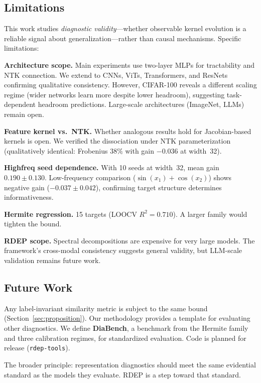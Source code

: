 \documentclass[twoside,11pt]{article}
\begin{document}
\subsection{Limitations}

This work studies \emph{diagnostic validity}---whether observable kernel evolution is a reliable signal about generalization---rather than causal mechanisms. Specific limitations:

\textbf{Architecture scope.} Main experiments use two-layer MLPs for tractability and NTK connection. We extend to CNNs, ViTs, Transformers, and ResNets confirming qualitative consistency. However, CIFAR-100 reveals a different scaling regime (wider networks learn more despite lower headroom), suggesting task-dependent headroom predictions. Large-scale architectures (ImageNet, LLMs) remain open.

\textbf{Feature kernel vs.\ NTK.} Whether analogous results hold for Jacobian-based kernels is open. We verified the dissociation under NTK parameterization (qualitatively identical: Frobenius $38\%$ with gain $-0.036$ at width~32).

\textbf{Highfreq seed dependence.} With 10 seeds at width~32, mean gain $0.190\pm0.130$. Low-frequency comparison ($\sin(x_1)+\cos(x_2)$) shows negative gain ($-0.037\pm0.042$), confirming target structure determines informativeness.

\textbf{Hermite regression.} 15 targets (LOOCV $R^2=0.710$). A larger family would tighten the bound.

\textbf{RDEP scope.} Spectral decompositions are expensive for very large models. The framework's cross-modal consistency suggests general validity, but LLM-scale validation remains future work.

\subsection{Future Work}

Any label-invariant similarity metric is subject to the same bound (Section~\ref{sec:proposition}). Our methodology provides a template for evaluating other diagnostics. We define \textbf{DiaBench}, a benchmark from the Hermite family and three calibration regimes, for standardized evaluation. Code is planned for release (\texttt{rdep-tools}).

The broader principle: representation diagnostics should meet the same evidential standard as the models they evaluate. RDEP is a step toward that standard.
\end{document}
